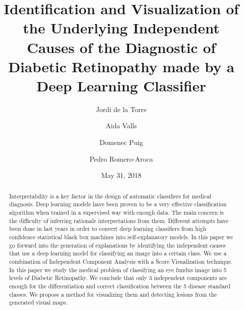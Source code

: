 \documentclass[review]{elsarticle}
\theoremstyle{definition} %
\theoremstyle{remark}
\begin{document}
\begin{frontmatter}

\title{Identification and Visualization of the Underlying Independent Causes of the Diagnostic of Diabetic Retinopathy made by a Deep Learning Classifier}

\author[label1]{Jordi de la Torre}
\address[label1]{Departament d'Enginyeria Inform\`atica i Matem\`atiques.\\Escola T\`ecnica Superior d'Enginyeria.\\Universitat Rovira i Virgili\\Avinguda Paisos Catalans, 26. E-43007\\
	Tarragona, Spain}
\author[label1]{Aida Valls}
\author[label1]{Domenec Puig}
\author[label2]{Pedro Romero-Aroca}





\address[label2]{Ophthalmic Service. University Hospital Sant Joan de Reus\\Institut d’Investigaci\'o Sanit\`aria Pere Virgili (IISPV)\\ Universitat Rovira i Virgili\\Reus (Tarragona)\\Avinguda de la Universitat, 1. E-43204\\Reus, Spain}

\date{May 31, 2018}

\begin{abstract}
Interpretability is a key factor in the design of automatic classifiers for medical diagnosis. Deep learning models have been proven to be a very effective classification algorithm when trained in a supervised way with enough data. The main concern is the difficulty of inferring rationale interpretations from them. Different attempts have been done in last years in order to convert deep learning classifiers from high confidence statistical black box machines into self-explanatory models. In this paper we go forward into the generation of explanations by identifying the independent causes that use a deep learning model for classifying an image into a certain class. We use a combination of Independent Component Analysis with a Score Visualization technique. In this paper we study the medical problem of classifying an eye fundus image into 5 levels of Diabetic Retinopathy. We conclude that only 3 independent components are enough for the differentiation and correct classification between the 5 disease standard classes. We propose a method for visualizing them and detecting lesions from the generated visual maps.
\end{abstract}


\end{frontmatter}
\end{document}
